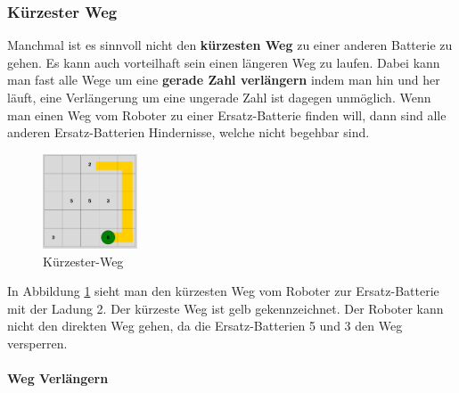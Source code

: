 \documentclass[a4paper,12pt,arial]{scrartcl}
\begin{document}
\subsubsection{Kürzester Weg}
Manchmal ist es sinnvoll nicht den \textbf{kürzesten Weg} zu einer anderen Batterie zu gehen.
Es kann auch vorteilhaft sein einen längeren Weg zu laufen. Dabei kann man fast alle Wege um eine \textbf{gerade Zahl verlängern} indem man hin und her läuft, eine Verlängerung um eine ungerade Zahl ist dagegen unmöglich.
Wenn man einen Weg vom Roboter zu einer Ersatz-Batterie finden will, dann sind alle anderen Ersatz-Batterien Hindernisse, welche nicht begehbar sind.
\captionsetup[figure]{name=Abb.}
\begin{figure}
\vspace{-10pt}
    \includegraphics[width=0.25\textwidth]{shortest_w.pdf}
    \vspace{-25pt}
    \caption{Kürzester-Weg}
    \label{fig:weg}
\vspace{-30pt}
\end{figure}
\captionsetup[figure]{name=Abbildung}
In Abbildung \ref{fig:weg}  sieht man den kürzesten Weg vom Roboter zur Ersatz-Batterie mit der Ladung 2. Der kürzeste Weg ist gelb gekennzeichnet. Der Roboter kann nicht den direkten Weg gehen, da die Ersatz-Batterien 5 und 3 den Weg versperren.

\paragraph{Weg Verlängern}
\end{document}
